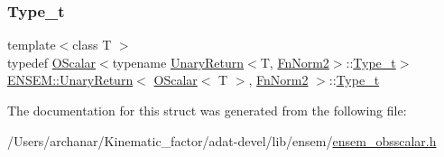 \mbox{\label{structENSEM_1_1UnaryReturn_3_01OScalar_3_01T_01_4_00_01FnNorm2_01_4_ac5e99e6905d2033009638fb21f07f1be}} 
\subsubsection{\texorpdfstring{Type\_t}{Type\_t}\hspace{0.1cm}{\footnotesize\ttfamily [3/3]}}
{\footnotesize\ttfamily template$<$class T $>$ \\
typedef \mbox{\hyperlink{classENSEM_1_1OScalar}{O\+Scalar}}$<$typename \mbox{\hyperlink{structENSEM_1_1UnaryReturn}{Unary\+Return}}$<$T, \mbox{\hyperlink{structENSEM_1_1FnNorm2}{Fn\+Norm2}}$>$\+::\mbox{\hyperlink{structENSEM_1_1UnaryReturn_3_01OScalar_3_01T_01_4_00_01FnNorm2_01_4_ac5e99e6905d2033009638fb21f07f1be}{Type\+\_\+t}}$>$ \mbox{\hyperlink{structENSEM_1_1UnaryReturn}{E\+N\+S\+E\+M\+::\+Unary\+Return}}$<$ \mbox{\hyperlink{classENSEM_1_1OScalar}{O\+Scalar}}$<$ T $>$, \mbox{\hyperlink{structENSEM_1_1FnNorm2}{Fn\+Norm2}} $>$\+::\mbox{\hyperlink{structENSEM_1_1UnaryReturn_3_01OScalar_3_01T_01_4_00_01FnNorm2_01_4_ac5e99e6905d2033009638fb21f07f1be}{Type\+\_\+t}}}



The documentation for this struct was generated from the following file\+:\begin{DoxyCompactItemize}
\item 
/\+Users/archanar/\+Kinematic\+\_\+factor/adat-\/devel/lib/ensem/\mbox{\hyperlink{adat-devel_2lib_2ensem_2ensem__obsscalar_8h}{ensem\+\_\+obsscalar.\+h}}\end{DoxyCompactItemize}
